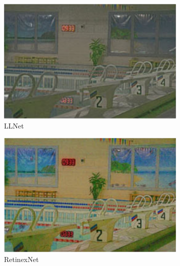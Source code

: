 \documentclass[a4paper]{ctexart}
\begin{document}
\begin{figure}[htb]
\begin{subfigure}{0.19\textwidth}
			\label{fig: LightenNet}
		\end{subfigure}
		\begin{subfigure}{0.19\textwidth}
			\includegraphics[width=\linewidth]{picture/LLIE/Efficent/LLNet}				
			\captionsetup{font=scriptsize}
			\caption{LLNet}
			\label{fig: LLI LLNet}	
		\end{subfigure}
		\begin{subfigure}{0.19\textwidth}
			\includegraphics[width=\linewidth]{picture/LLIE/Efficent/RetinexNet}
			\captionsetup{font=scriptsize}
			\caption{RetinexNet}
			\label{fig: LLI RetinexNet}	
		\end{subfigure}
		\begin{subfigure}{0.19\textwidth}

\end{subfigure}
\end{figure}
\end{document}
